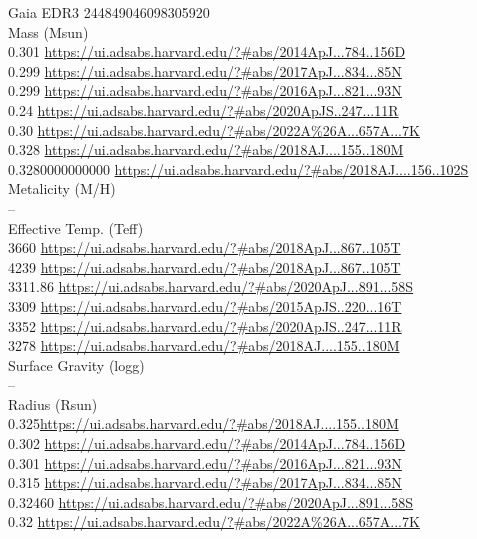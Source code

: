 Gaia EDR3 244849046098305920\\
Mass (Msun)\\
0.301 \url{https://ui.adsabs.harvard.edu/?#abs/2014ApJ...784..156D}\\
0.299 \url{https://ui.adsabs.harvard.edu/?#abs/2017ApJ...834...85N}\\
0.299 \url{https://ui.adsabs.harvard.edu/?#abs/2016ApJ...821...93N}\\
0.24 \url{https://ui.adsabs.harvard.edu/?#abs/2020ApJS..247...11R}\\
0.30 \url{https://ui.adsabs.harvard.edu/?#abs/2022A%26A...657A...7K}\\
0.328 \url{https://ui.adsabs.harvard.edu/?#abs/2018AJ....155..180M}\\
0.3280000000000 \url{https://ui.adsabs.harvard.edu/?#abs/2018AJ....156..102S}\\
Metalicity (M/H)\\
--\\
Effective Temp. (Teff)\\
3660 \url{https://ui.adsabs.harvard.edu/?#abs/2018ApJ...867..105T}\\
4239 \url{https://ui.adsabs.harvard.edu/?#abs/2018ApJ...867..105T}\\
3311.86 \url{https://ui.adsabs.harvard.edu/?#abs/2020ApJ...891...58S}\\
3309 \url{https://ui.adsabs.harvard.edu/?#abs/2015ApJS..220...16T}\\
3352 \url{https://ui.adsabs.harvard.edu/?#abs/2020ApJS..247...11R}\\
3278 \url{https://ui.adsabs.harvard.edu/?#abs/2018AJ....155..180M}\\
Surface Gravity (logg)\\
--\\
Radius (Rsun)\\
0.325\url{https://ui.adsabs.harvard.edu/?#abs/2018AJ....155..180M}\\
0.302 \url{https://ui.adsabs.harvard.edu/?#abs/2014ApJ...784..156D}\\
0.301 \url{https://ui.adsabs.harvard.edu/?#abs/2016ApJ...821...93N}\\
0.315 \url{https://ui.adsabs.harvard.edu/?#abs/2017ApJ...834...85N}\\
0.32460 \url{https://ui.adsabs.harvard.edu/?#abs/2020ApJ...891...58S}\\
0.32 \url{https://ui.adsabs.harvard.edu/?#abs/2022A%26A...657A...7K}\\
